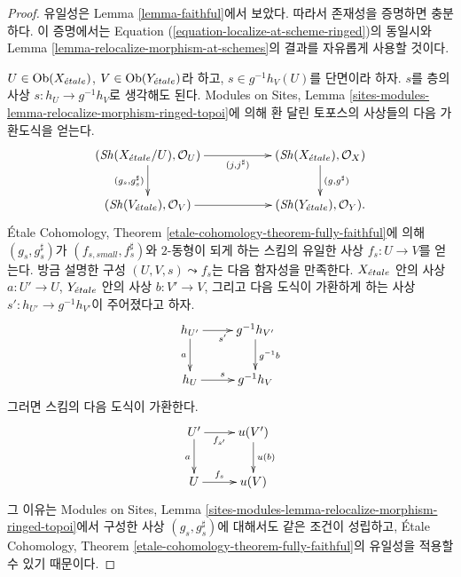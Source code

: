 \begin{proof}
유일성은 Lemma \ref{lemma-faithful}에서 보았다. 따라서 존재성을
증명하면 충분하다. 이 증명에서는 Equation
(\ref{equation-localize-at-scheme-ringed})의 동일시와 Lemma
\ref{lemma-relocalize-morphism-at-schemes}의 결과를 자유롭게 사용할 것이다.

\medskip\noindent
$U \in \mathop{\mathrm{Ob}}\nolimits(X_{\acute{e}tale})$, $V \in \mathop{\mathrm{Ob}}\nolimits(Y_{\acute{e}tale})$라 하고,
$s \in g^{-1}h_V(U)$를 단면이라 하자. $s$를 층의 사상
$s : h_U \to g^{-1}h_V$로 생각해도 된다. Modules on Sites, Lemma
\ref{sites-modules-lemma-relocalize-morphism-ringed-topoi}에 의해 환 달린
토포스의 사상들의 다음 가환도식을 얻는다.
$$
\xymatrix{
(\Sh(X_\etale/U), \mathcal{O}_U)
\ar[rr]_-{(j, j^\sharp)} \ar[d]_{(g_s, g_s^\sharp)} & &
(\Sh(X_\etale), \mathcal{O}_X) \ar[d]^{(g, g^\sharp)} \\
(\Sh(V_\etale), \mathcal{O}_V) \ar[rr] & &
(\Sh(Y_\etale), \mathcal{O}_Y).
}
$$
\'Etale Cohomology, Theorem
\ref{etale-cohomology-theorem-fully-faithful}에 의해
$(g_s, g_s^\sharp)$가 $(f_{s, small}, f_s^\sharp)$와 $2$-동형이 되게
하는 스킴의 유일한 사상 $f_s : U \to V$를 얻는다. 방금 설명한 구성
$(U, V, s) \leadsto f_s$는 다음 함자성을 만족한다. $X_{\acute{e}tale}$ 안의
사상 $a : U' \to U$, $Y_{\acute{e}tale}$ 안의 사상 $b : V' \to V$, 그리고
다음 도식이 가환하게 하는 사상 $s' : h_{U'} \to g^{-1}h_{V'}$이
주어졌다고 하자.
$$
\xymatrix{
h_{U'} \ar[d]_a \ar[r]_{s'} & g^{-1}h_{V'} \ar[d]^{g^{-1}b} \\
h_U \ar[r]^s & g^{-1}h_V
}
$$
그러면 스킴의 다음 도식이 가환한다.
$$
\xymatrix{
U' \ar[r]_-{f_{s'}} \ar[d]_a & u(V') \ar[d]^{u(b)} \\
U \ar[r]^-{f_s} & u(V)
}
$$
그 이유는 Modules on Sites, Lemma
\ref{sites-modules-lemma-relocalize-morphism-ringed-topoi}에서 구성한
사상 $(g_s, g_s^\sharp)$에 대해서도 같은 조건이 성립하고,
\'Etale Cohomology, Theorem
\ref{etale-cohomology-theorem-fully-faithful}의 유일성을 적용할 수 있기
때문이다.


\end{proof}
